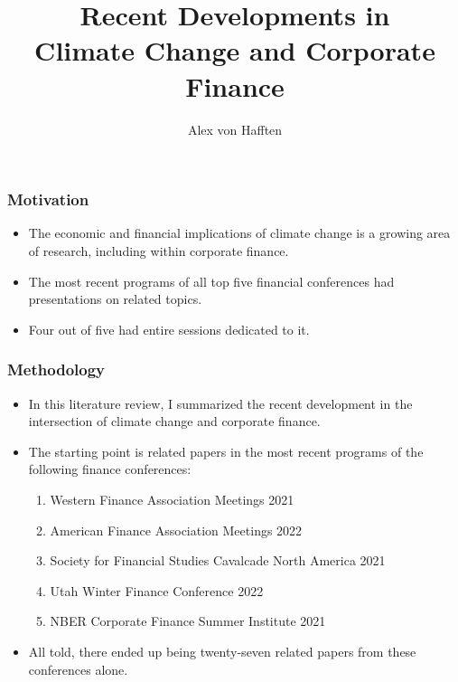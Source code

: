 \documentclass{beamer}
\title[Climate Change and Corporate Finance]{Recent Developments in \\ Climate Change and Corporate Finance}
\author{Alex von Hafften}
\institute{UW-Madison}
\begin{document}
\begin{frame}
\titlepage
\end{frame}

\begin{frame}
\frametitle{Motivation}
\begin{itemize}[<+->]
\item The economic and financial implications of climate change is a growing area of research, including within corporate finance.
\bigskip
\item The most recent programs of all top five financial conferences had presentations on related topics.
\bigskip
\item Four out of five had entire sessions dedicated to it.
\end{itemize}
\end{frame}



\begin{frame}
\frametitle{Methodology}
\begin{itemize}[<+->]
\item In this literature review, I summarized the recent development in the intersection of climate change and corporate finance.
\bigskip
\item The starting point is related papers in the most recent programs of the following finance conferences:
\begin{enumerate}
\item Western Finance Association Meetings 2021
\item American Finance Association Meetings 2022
\item Society for Financial Studies Cavalcade North America 2021
\item Utah Winter Finance Conference 2022
\item NBER Corporate Finance Summer Institute 2021
\end{enumerate}
\bigskip
\item All told, there ended up being twenty-seven related papers from these conferences alone.
\end{itemize}
\end{frame}
\end{document}
